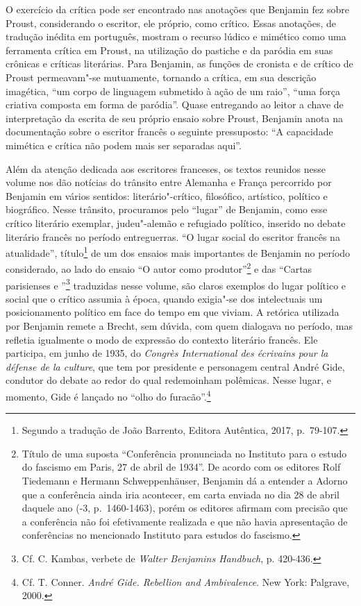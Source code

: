 O exercício da crítica pode ser encontrado nas anotações que Benjamin fez sobre Proust, considerando o escritor, ele próprio, como crítico. Essas anotações, de tradução inédita em português, mostram o recurso lúdico e mimético como uma ferramenta crítica em Proust, na utilização do pastiche e da paródia em suas crônicas e críticas literárias. Para Benjamin, as funções de cronista e de crítico de Proust permeavam"-se mutuamente, tornando a crítica, em sua descrição imagética, ``um corpo de linguagem submetido à ação de um raio'', ``uma força criativa composta em forma de paródia''. Quase entregando ao leitor a chave de interpretação da escrita de seu próprio ensaio sobre Proust, Benjamin anota na documentação sobre o escritor francês o seguinte pressuposto: ``A capacidade mimética e crítica não podem mais ser separadas aqui''.

Além da atenção dedicada aos escritores franceses, os textos reunidos nesse volume nos dão notícias do trânsito
entre Alemanha e França percorrido por Benjamin em vários sentidos:
literário"-crítico, filosófico, artístico, político e biográfico. Nesse trânsito, procuramos pelo ``lugar'' de Benjamin, como esse crítico literário exemplar,
judeu"-alemão e refugiado político, inserido no debate literário francês no período
entreguerras. ``O lugar social do escritor francês na atualidade'',
título\footnote{Segundo a tradução de João Barrento, Editora Autêntica,
  2017, p.~79-107.} de um dos ensaios mais importantes de Benjamin no
período considerado, ao lado do ensaio ``O autor como
produtor''\footnote{Título de uma suposta ``Conferência pronunciada no
  Instituto para o estudo do fascismo em Paris, 27 de abril de 1934''.
  De acordo com os editores Rolf Tiedemann e Hermann Schweppenhäuser,
  Benjamin dá a entender a Adorno que a conferência ainda iria
  acontecer, em carta enviada no dia 28 de abril daquele ano (-3, p.~1460-1463), porém os editores afirmam com
  precisão que a conferência não foi efetivamente realizada e que não
  havia apresentação de conferências no mencionado Instituto para
  estudos do fascismo.} e das ``Cartas parisienses  e ''\footnote{Cf.
  C. Kambas, verbete de \emph{Walter Benjamins Handbuch}, p. 420-436.}
traduzidas nesse volume, são claros exemplos do lugar político e social
que o crítico assumia à época, quando exigia"-se dos intelectuais um
posicionamento político em face do tempo em que viviam. A retórica utilizada por
Benjamin remete a Brecht, sem dúvida, com quem dialogava no período, mas
refletia igualmente o modo de expressão do contexto literário francês.
Ele participa, em junho de 1935, do \emph{Congrès International des
écrivains pour la défense de la culture}, que tem por presidente e
personagem central André Gide, condutor do debate ao redor do qual
redemoinham polêmicas. Nesse lugar, e momento, Gide é lançado no ``olho do
furacão''.\footnote{Cf. T. Conner. \emph{André Gide. Rebellion and
  Ambivalence}. New York: Palgrave, 2000.}

